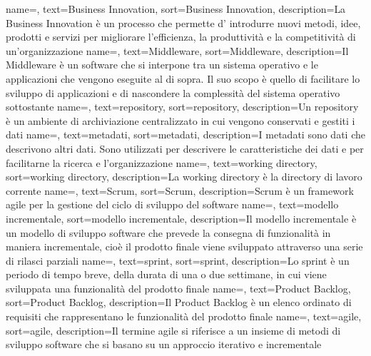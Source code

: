 {
    name=,
    text=Business Innovation,
    sort=Business Innovation,
    description={La Business Innovation è un processo che permette d' introdurre nuovi metodi, idee, prodotti e servizi per migliorare l'efficienza, la produttività e la competitività di un'organizzazione}
}
{
    name=,
    text=Middleware,
    sort=Middleware,
    description={Il Middleware è un software che si interpone tra un sistema operativo e le applicazioni che vengono eseguite al di sopra. Il suo scopo è quello di facilitare lo sviluppo di applicazioni e di nascondere la complessità del sistema operativo sottostante}
}
{
    name=,
    text=repository,
    sort=repository,
    description={Un repository è un ambiente di archiviazione centralizzato in cui vengono conservati e gestiti i dati}
}
{
    name=,
    text=metadati,
    sort=metadati,
    description={I metadati sono dati che descrivono altri dati. Sono utilizzati per descrivere le caratteristiche dei dati e per facilitarne la ricerca e l'organizzazione}
}
{
    name=,
    text=working directory,
    sort=working directory,
    description={La working directory è la directory di lavoro corrente}
}
{
    name=,
    text=Scrum,
    sort=Scrum,
    description={Scrum è un framework agile per la gestione del ciclo di sviluppo del software}
}
{
    name=,
    text=modello incrementale,
    sort=modello incrementale,
    description={Il modello incrementale è un modello di sviluppo software che prevede la consegna di funzionalità in maniera incrementale, cioè il prodotto finale viene 
    sviluppato attraverso una serie di rilasci parziali}
}
{
    name=,
    text=sprint,
    sort=sprint,
    description={Lo sprint è un periodo di tempo breve, della durata di una o due settimane, in cui viene sviluppata 
    una funzionalità del prodotto finale}
}
{
    name=,
    text=Product Backlog,
    sort=Product Backlog,
    description={Il Product Backlog è un elenco ordinato di requisiti che rappresentano le funzionalità del prodotto finale}
}
{
    name=,
    text=agile,
    sort=agile,
    description={Il termine agile si riferisce a un insieme di metodi di sviluppo software che si basano su un approccio iterativo e incrementale}
}
